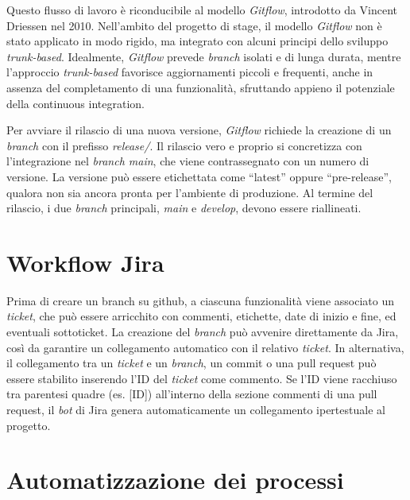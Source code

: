 \vspace{10pt}
\noindent Questo flusso di lavoro è riconducibile al modello \textit{Gitflow}, introdotto da Vincent Driessen nel 2010. Nell’ambito del progetto di stage, il modello \textit{Gitflow} non è stato applicato in modo rigido, ma integrato con alcuni principi dello sviluppo \textit{trunk-based}. Idealmente, \textit{Gitflow} prevede \textit{branch} isolati e di lunga durata, mentre l’approccio \textit{trunk-based} favorisce aggiornamenti piccoli e frequenti, anche in assenza del completamento di una funzionalità, sfruttando appieno il potenziale della \gls{continuous integration}.

\vspace{10pt}
\noindent Per avviare il rilascio di una nuova versione, \textit{Gitflow} richiede la creazione di un \textit{branch} con il prefisso \textit{release/}. Il rilascio vero e proprio si concretizza con l’integrazione nel \textit{branch main}, che viene contrassegnato con un numero di versione. La versione può essere etichettata come “latest” oppure “pre-release”, qualora non sia ancora pronta per l’ambiente di produzione. Al termine del rilascio, i due \textit{branch} principali, \textit{main} e \textit{develop}, devono essere riallineati.

\section{Workflow Jira}

Prima di creare un branch su \gls{github}, a ciascuna funzionalità viene associato un \textit{ticket}, che può essere arricchito con commenti, etichette, date di inizio e fine, ed eventuali sottoticket. La creazione del \textit{branch} può avvenire direttamente da Jira, così da garantire un collegamento automatico con il relativo \textit{ticket}. In alternativa, il collegamento tra un \textit{ticket} e un \textit{branch}, un \gls{commit} o una \gls{pull request} può essere stabilito inserendo l’ID del \textit{ticket} come commento. Se l’ID viene racchiuso tra parentesi quadre (es. [ID]) all’interno della sezione commenti di una \gls{pull request}, il \textit{bot} di Jira genera automaticamente un collegamento ipertestuale al progetto.

\section{Automatizzazione dei processi}

